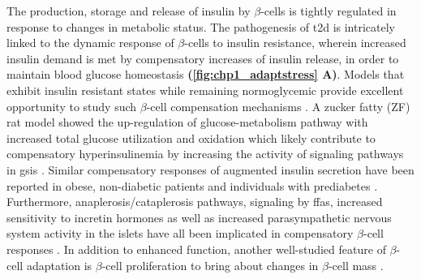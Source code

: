 \par The production, storage and release of insulin by $\beta$-cells is tightly regulated in response to changes in metabolic status. The pathogenesis of \gls{t2d} is intricately linked to the dynamic response of $\beta$-cells to insulin resistance, wherein increased insulin demand is met by compensatory increases of insulin release, in order to maintain blood glucose homeostasis \textbf{(\autoref{fig:chp1_adaptstress} A)}. Models that exhibit insulin resistant states while remaining normoglycemic provide excellent opportunity to study such $\beta$-cell compensation mechanisms \textbf{\cite{prentki_islet_2006, liu_beta-cell_2002}}. A zucker fatty (ZF) rat model showed the up-regulation of glucose-metabolism pathway with increased total glucose utilization and oxidation which likely contribute to compensatory hyperinsulinemia by increasing the activity of signaling pathways in \gls{gsis} \textbf{\cite{liu_beta-cell_2002}}. Similar compensatory responses of augmented insulin secretion have been reported in obese, non-diabetic patients and individuals with prediabetes \textbf{\cite{hudish__2019,chandrashekar_25-hydroxy_2015,polonsky_twenty-four-hour_1988}}. Furthermore, anaplerosis/cataplerosis pathways, signaling by \glspl{ffa}, increased sensitivity to incretin hormones as well as increased parasympathetic nervous system activity in the islets have all been implicated in compensatory $\beta$-cell responses \textbf{\cite{prentki_islet_2006}}. In addition to enhanced function, another well-studied feature of $\beta$-cell adaptation is $\beta$-cell proliferation to bring about changes in $\beta$-cell mass \textbf{\cite{hudish__2019}}.\\

